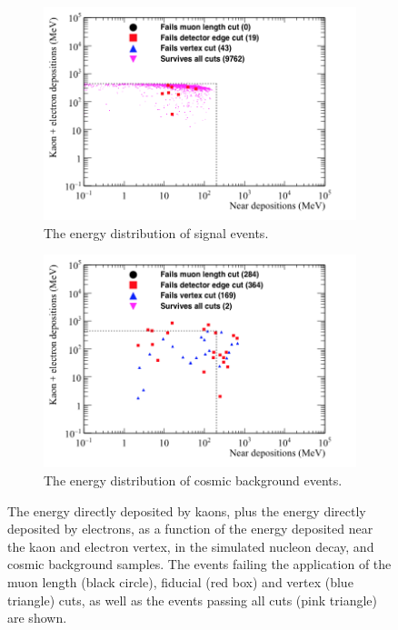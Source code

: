 \begin{figure}
  \centering
  \begin{subfigure}{0.8\textwidth}
    \includegraphics[width=\textwidth]{NucleonDecay_KaonElec_vs_Near_Can}
    \caption{The energy distribution of signal events.}
    \label{fig:NDK_KaonElec_Near_EDist_Sig}
  \end{subfigure}
  \begin{subfigure}{0.8\textwidth}
    \includegraphics[width=\textwidth]{CosmicBackground_KaonElec_vs_Near_Can}
    \caption{The energy distribution of cosmic background events.}
    \label{fig:NDK_KaonElec_Near_EDist_Cosmo}
  \end{subfigure}
  \caption[The energy directly deposited by kaons, plus the energy directly deposited by electrons, as a function of the energy deposited near the kaon and electron vertex, in the simulated nucleon decay, and cosmic background samples]
          {The energy directly deposited by kaons, plus the energy directly deposited by electrons, as a function of the energy deposited near the kaon and electron vertex, in the simulated nucleon decay, and cosmic background samples. The events failing the application of the muon length (black circle), fiducial (red box) and vertex (blue triangle) cuts, as well as the events passing all cuts (pink triangle) are shown.}
  \label{fig:NDK_KaonElec_Near_EDist}
\end{figure}

